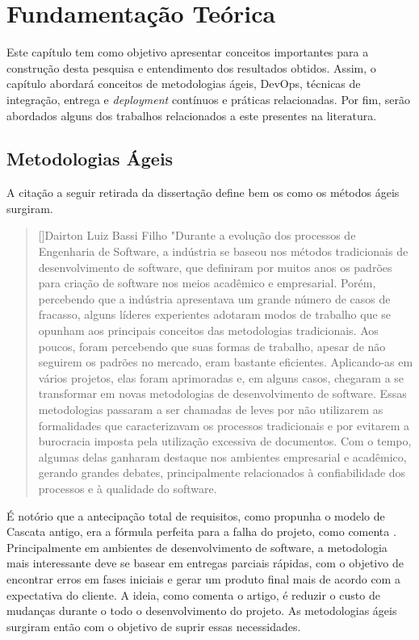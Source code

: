 \chapter{Fundamentação Teórica}

Este capítulo tem como objetivo apresentar conceitos importantes para a
construção desta pesquisa e entendimento dos resultados obtidos. Assim, o capítulo abordará conceitos de metodologias ágeis, DevOps, técnicas de integração, entrega e \emph{deployment} contínuos e práticas relacionadas. Por fim, serão abordados alguns dos trabalhos relacionados a este presentes na literatura.


\section{Metodologias Ágeis}

A citação a seguir retirada da dissertação \cite{experienciaComAgil} define bem os como os métodos ágeis surgiram.

    
\begin{quotation}[]{Dairton Luiz Bassi Filho}
    "Durante a evolução dos processos de Engenharia de Software, a
indústria se baseou nos métodos tradicionais de desenvolvimento de
software, que definiram por muitos anos os padrões para criação de
software nos meios acadêmico e empresarial. Porém, percebendo que a
indústria apresentava um grande número de casos de fracasso, alguns
líderes experientes adotaram modos de trabalho que se opunham aos
principais conceitos das metodologias tradicionais. Aos poucos, foram
percebendo que suas formas de trabalho, apesar de não seguirem os
padrões no mercado, eram bastante eficientes. Aplicando-as em vários 
projetos, elas foram aprimoradas e, em alguns casos, chegaram a se
transformar em novas metodologias de desenvolvimento de software.
Essas metodologias passaram a ser chamadas de leves por não
utilizarem as formalidades que caracterizavam os processos tradicionais
e por evitarem a burocracia imposta pela utilização excessiva de
documentos. Com o tempo, algumas delas ganharam destaque nos
ambientes empresarial e acadêmico, gerando grandes debates,
principalmente relacionados à confiabilidade dos processos e à
qualidade do software.
\end{quotation}

É notório que a antecipação total de requisitos, como propunha o modelo de Cascata antigo, era a fórmula perfeita para a falha do projeto, como comenta \cite{agileSoftwareDevelopment}. Principalmente em ambientes de desenvolvimento de software, a metodologia mais interessante deve se basear em entregas parciais rápidas, com o objetivo de encontrar erros em fases iniciais e gerar um produto final mais de acordo com a expectativa do cliente. A ideia, como comenta o artigo, é reduzir o custo de mudanças durante o todo o desenvolvimento do projeto. As metodologias ágeis surgiram então com o objetivo de suprir essas necessidades.

